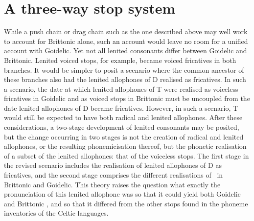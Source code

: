 \section{A three-way stop system}
\label{sec:three-way-stop}
While a push chain or drag chain such as the one described above may well work to account for Brittonic alone, such an account would leave no room for a unified account with Goidelic. Yet not all lenited consonants differ between Goidelic and Brittonic. Lenited voiced stops, for example, became voiced fricatives in both branches. It would be simpler to posit a scenario where the common ancestor of these branches also had the lenited allophones of \gls{D} realised as fricatives. In such a scenario, the date at which lenited allophones of \gls{T} were realised as voiceless fricatives in Goidelic and as voiced stops in Brittonic must be uncoupled from the date lenited allophones of \gls{D} became fricatives. However, in such a scenario, \gls{T} would still be expected to have both radical and lenited allophones.  After these considerations, a two-stage development of lenited consonants may be posited, but the change occurring in two stages is not the creation of radical and lenited allophones, or the resulting phonemicisation thereof, but the phonetic realisation of a subset of the lenited allophones: that of the voiceless stops. The first stage in the revised scenario includes the realisation of lenited allophones of \gls{D} as fricatives, and the second stage  comprises the different realisations of \lT\ in Brittonic and Goidelic. This theory raises the question what exactly the pronunciation of this lenited \gls{allophone} was so that it could yield both Goidelic and Brittonic \lT, and so that it differed from the other stops found in the \gls{phoneme} inventories of the Celtic languages.


